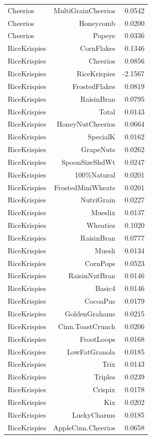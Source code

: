 \begin{longtable}{@{}lrr@{}}
Cheerios & MultiGrainCheerios & 0.0542 \\
Cheerios & Honeycomb & 0.0200 \\
Cheerios & Popeye & 0.0336 \\
RiceKrispies & CornFlakes & 0.1346 \\
RiceKrispies & Cheerios & 0.0856 \\
RiceKrispies & RiceKrispies & -2.1567 \\
RiceKrispies & FrostedFlakes & 0.0819 \\
RiceKrispies & RaisinBran & 0.0795 \\
RiceKrispies & Total & 0.0143 \\
RiceKrispies & HoneyNutCheerios & 0.0664 \\
RiceKrispies & SpecialK & 0.0162 \\
RiceKrispies & GrapeNuts & 0.0262 \\
RiceKrispies & SpoonSizeShdWt & 0.0247 \\
RiceKrispies & 100\%Natural & 0.0201 \\
RiceKrispies & FrostedMiniWheats & 0.0201 \\
RiceKrispies & NutriGrain & 0.0227 \\
RiceKrispies & Mueslix & 0.0137 \\
RiceKrispies & Wheaties & 0.1020 \\
RiceKrispies & RaisinBran & 0.0777 \\
RiceKrispies & Muesli & 0.0134 \\
RiceKrispies & CornPops & 0.0523 \\
RiceKrispies & RaisinNutBran & 0.0146 \\
RiceKrispies & Basic4 & 0.0146 \\
RiceKrispies & CocoaPus & 0.0179 \\
RiceKrispies & GoldenGrahams & 0.0215 \\
RiceKrispies & Cinn.ToastCrunch & 0.0206 \\
RiceKrispies & FrootLoops & 0.0168 \\
RiceKrispies & LowFatGranola & 0.0185 \\
RiceKrispies & Trix & 0.0143 \\
RiceKrispies & Triples & 0.0239 \\
RiceKrispies & Crispix & 0.0178 \\
RiceKrispies & Kix & 0.0202 \\
RiceKrispies & LuckyCharms & 0.0185 \\
RiceKrispies & AppleCinn.Cheerios & 0.0658 \\

\end{longtable}
